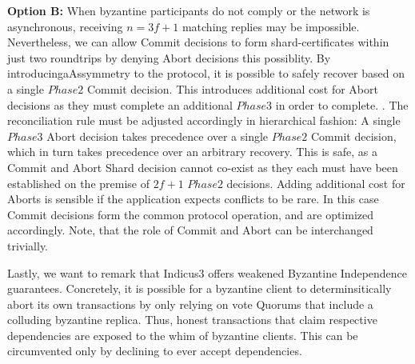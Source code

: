 \textbf{Option B:} When byzantine participants do not comply or the network is asynchronous, receiving $n =3f+1$ matching replies may be impossible. Nevertheless, we can allow Commit decisions to form shard-certificates within just two roundtrips by denying Abort decisions this possiblity. By introducingaAssymmetry to the protocol, it is possible to safely recover based on a single $Phase2$ Commit decision. This introduces additional cost for Abort decisions as they must complete an additional $Phase3$ in order to complete. . The reconciliation rule must be adjusted accordingly in hierarchical fashion: A single $Phase3$ Abort decision takes precedence over a single $Phase2$ Commit decision, which in turn takes precedence over an arbitrary recovery. This is safe, as a Commit and Abort Shard decision cannot co-exist as they each must have been established on the premise of $2f+1$ $Phase2$ decisions. 
Adding additional cost for Aborts is sensible if the application expects conflicts to be rare. In this case Commit decisions form the common protocol operation, and are optimized accordingly. Note, that the role of Commit and Abort can be interchanged trivially.

Lastly, we want to remark that Indicus3 offers weakened Byzantine Independence guarantees. Concretely, it is possible for a byzantine client to determinsitically abort its own transactions by only relying on vote Quorums that include a colluding byzantine replica. Thus, honest transactions that claim respective dependencies are exposed to the whim of byzantine clients. This can be circumvented only by declining to ever accept dependencies.

